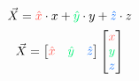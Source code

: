 \documentclass[preview]{standalone}
\begin{document}
$$\vec{X} = \textcolor[HTML]{fe5e56}{\hat{x}}\cdot x + \textcolor[HTML]{00ef75}{\hat{y}}\cdot y + \textcolor[HTML]{0069fe}{\hat{z}}\cdot z$$
$$\vec{X} = \begin{bmatrix}\textcolor[HTML]{fe5e56}{\hat{x}}&\textcolor[HTML]{00ef75}{\hat{y}}&\textcolor[HTML]{0069fe}{\hat{z}}\end{bmatrix}\begin{bmatrix}\textcolor[HTML]{fe5e56}{x}\\\textcolor[HTML]{00ef75}{y}\\\textcolor[HTML]{0069fe}{z}\end{bmatrix}$$
\end{document}

